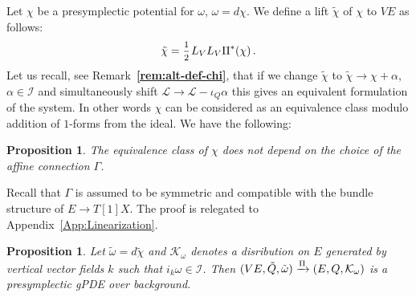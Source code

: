 \documentclass[a4paper,12pt]{article}
\numberwithin{equation}{section} %
\newtheorem{prop}[thm]{Proposition}
\renewcommand{\tilde}{\widetilde}
\newcommand{\bref}[1]{\textbf{\ref{#1}}}
\newcommand{\half}{\mathchoice{%
    \ffrac{1}{2}}{\frac{1}{2}}{\frac{1}{2}}{\frac{1}{2}}}
\newcommand{\ffrac}[2]{\raisebox{.5pt}%
  {\footnotesize$\displaystyle\frac{#1}{#2}$}\kern1pt}
\def\cI{\mathcal{I}}
\def\cK{\mathcal{K}}
\def\cL{\mathcal{L}}
\begin{document}
Let $\chi$ be a presymplectic potential for $\omega$, $\omega=d\chi$. 
We define a lift $\tilde \chi$ of $\chi$
to $VE$ as follows:
\begin{equation}
 \Tilde{\chi} = \half L_V L_V \Pi^* (\chi)\,.
\end{equation}
Let us recall, see Remark~\bref{rem:alt-def-chi}, that if we change $\tilde\chi$ to $\tilde\chi\to \chi+\alpha$, $\alpha \in \cI$ and simultaneously shift $\cL\to \cL-\iota_Q\alpha$ this gives an equivalent formulation of the system. In other words $\chi$ can be considered as an equivalence class modulo addition of $1$-forms from the ideal. We have the following:
\begin{prop}
The equivalence class of $\chi$ does not depend on the choice of the affine connection $\Gamma$.
\end{prop}
Recall that $\Gamma$ is assumed to be symmetric and compatible with the bundle structure of $E\to T[1]X$.  The proof is relegated to Appendix~\ref{App:Linearization}.
\begin{prop}
Let $\tilde\omega=d\tilde\chi$ and $\cK_\omega$ denotes a disribution on $E$ generated by vertical vector fields $k$ such that $i_k\omega\in \cI$. Then 
    $(VE,\Tilde{Q}, \Tilde{\omega}) \xrightarrow{\Pi} (E,Q, \cK_\omega)$ is a presymplectic gPDE over background.
\end{prop}
\end{document}
